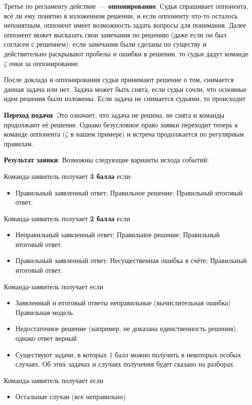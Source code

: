 \documentclass[12pt]{article}
\begin{document}
Третье по регламенту действие~--- \textbf{оппонирование}. Судья спрашивает оппонента, всё ли ему понятно в изложенном решении, и если оппоненту что-то осталось непонятным, оппонент имеет возможность задать вопросы для понимания. Далее оппонент может высказать свои замечания по решению (даже если он был согласен с решением): если замечания были сделаны по существу и действительно раскрывают пробелы и ошибки в решении, то судьи дадут команде $\zeta$ очки за оппонирование.

После доклада и оппонирования судьи принимают решение о том, снимается данная задача или нет. Задача может быть снята, если судьи сочли, что основные идеи решения были изложены. Если задача не снимается судьями, то происходит

\noindent\textbf{Переход подачи}. Это означает, что задача не решена, не снята и команды продолжают её решение. Однако безусловное право заявки переходит теперь к команде оппонента ($\zeta$ в нашем примере) и встреча продолжается по регулярным правилам.

\noindent\textbf{Результат заявки}. Возможны следующие варианты исхода событий:
\begin{list}{)}{\leftmargin=6mm  \topsep=0mm  \itemsep=1pt \parsep=0mm \itemindent=10pt}
\item Команда-заявитель получает \textbf{3 балла} если:
	\begin{itemize}
		\item Правильный заявленный ответ; 
		Правильное решение;
		Правильный итоговый ответ.
	\end{itemize}




\item Команда-заявитель получает \textbf{2 балла} если
	\begin{itemize}
		\item Неправильный заявленный ответ;
	Правильное решение;
	Правильный итоговый ответ.
	\item Правильный заявленный ответ;
	Несущественная ошибка в счёте;
	Правильный итоговый ответ.
	\end{itemize}

\item Команда-заявитель получает  если
	\begin{itemize}
		\item Заявленный и итоговый ответы неправильные (вычислительная ошибка)
	Правильная модель
	\item Недостаточное решение (например, не доказана единственность решения), однако ответ верный
	\item Существуют задачи, в которых 1 балл можно получить в некоторых особых случаях. Об этих задачах и случаях получения будет сказано на разборах
	\end{itemize}

\item Команда-заявитель получает  если
	\begin{itemize}
		\item Остальные случаи (все неправильно) 
	\end{itemize}
\end{list}
\end{document}
